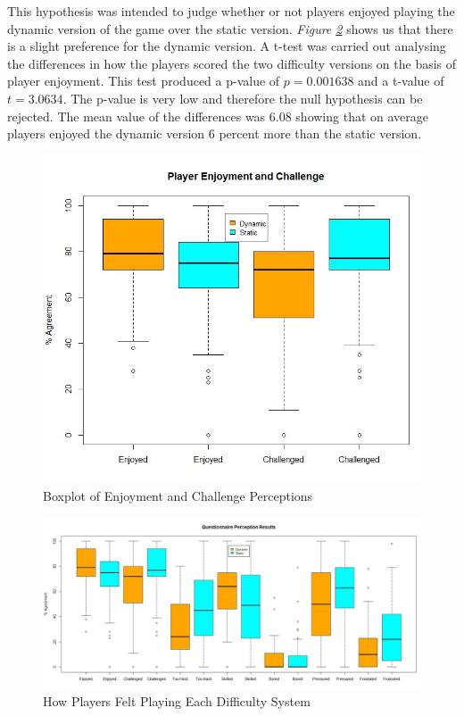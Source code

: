 \documentclass[journal]{IEEEtran}
\begin{document}
This hypothesis was intended to judge whether or not players enjoyed playing the dynamic version of the game over the static version. \textit{Figure \ref{fig::6}} shows us that there is a slight preference for the dynamic version. A t-test was carried out analysing the differences in how the players scored the two difficulty versions on the basis of player enjoyment. This test produced a p-value of $p = 0.001638$ and a t-value of $t = 3.0634$. The p-value is very low and therefore the null hypothesis can be rejected. The mean value of the differences was 6.08 showing that on average players enjoyed the dynamic version 6 percent more than the static version.


\begin{figure}[h]
	\includegraphics[width=1.0\linewidth]{playerenjoymentandchallenge.jpg}
	\caption{Boxplot of Enjoyment and Challenge Perceptions}
	\label{fig::5}
\end{figure} 

\begin{figure}[h]
	\includegraphics[width=1.0\linewidth]{questionnaireboxplot.jpg}
	\caption{How Players Felt Playing Each Difficulty System}
	\label{fig::6}
\end{figure} 
\end{document}
